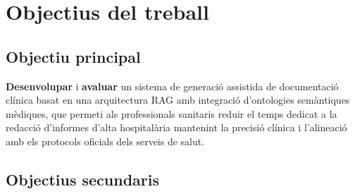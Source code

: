 \documentclass[CAT]{TFUOC}%
\begin{document}
\section{Objectius del treball}

\subsection*{Objectiu principal}

\textbf{Desenvolupar} i \textbf{avaluar} un sistema de generació assistida de documentació clínica basat en una arquitectura RAG amb integració d'ontologies semàntiques mèdiques, que permeti als professionals sanitaris reduir el temps dedicat a la redacció d'informes d'alta hospitalària mantenint la precisió clínica i l'alineació amb els protocols oficials dels serveis de salut.

\subsection*{Objectius secundaris}
\end{document}
